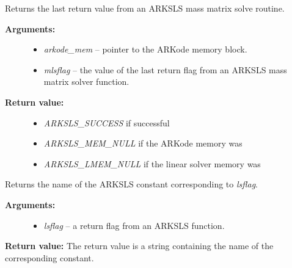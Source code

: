 \documentclass[letterpaper,10pt,english]{sphinxmanual}
\begin{document}
\begin{fulllineitems}
\label{c_interface/User_callable:c.ARKSlsGetLastMassFlag}
Returns the last return value from an ARKSLS mass matrix solve routine.
\begin{description}
\item[{\textbf{Arguments:}}] \leavevmode\begin{itemize}
\item {} 
\emph{arkode\_mem} -- pointer to the ARKode memory block.

\item {} 
\emph{mlsflag} -- the value of the last return flag from an ARKSLS
mass matrix solver function.

\end{itemize}

\item[{\textbf{Return value:}}] \leavevmode\begin{itemize}
\item {} 
\emph{ARKSLS\_SUCCESS} if successful

\item {} 
\emph{ARKSLS\_MEM\_NULL} if the ARKode memory was 

\item {} 
\emph{ARKSLS\_LMEM\_NULL} if the linear solver memory was 

\end{itemize}

\end{description}

\end{fulllineitems}


\begin{fulllineitems}
\label{c_interface/User_callable:c.ARKSlsGetReturnFlagName}
Returns the name of the ARKSLS constant
corresponding to \emph{lsflag}.
\begin{description}
\item[{\textbf{Arguments:}}] \leavevmode\begin{itemize}
\item {} 
\emph{lsflag} -- a return flag from an ARKSLS function.

\end{itemize}

\end{description}

\textbf{Return value:}  The return value is a string containing the name of
the corresponding constant.

\end{fulllineitems}
\end{document}
